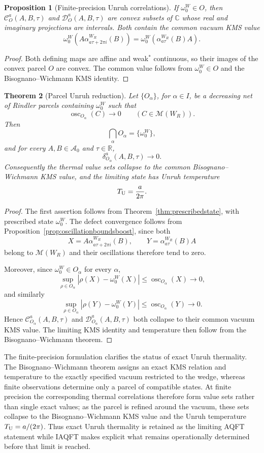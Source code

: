 \documentclass[11pt]{article}
\newtheorem{theorem}{Theorem}[section]
\newtheorem{proposition}[theorem]{Proposition}
\begin{document}
\begin{proposition}[Finite-precision Unruh correlations]
\label{thm:intervalunruh}
If $\omega_0^W\in O$, then
$\mathcal C_O^a(A,B,\tau)$ and
$\mathcal D_O^a(A,B,\tau)$ are convex subsets of $\mathbb C$ whose real
and imaginary projections are intervals. Both contain the common vacuum
KMS value
\[
\omega_0^W(A\alpha^{W_R}_{a\tau+2\pi i}(B))
=
\omega_0^W(\alpha^{W_R}_{a\tau}(B)A).
\]
\end{proposition}

\begin{proof}
Both defining maps are affine and weak$^*$ continuous, so their images of
the convex parcel $O$ are convex. The common value follows from
$\omega_0^W\in O$ and the Bisognano--Wichmann KMS identity.
\end{proof}

\begin{theorem}[Parcel Unruh reduction]
\label{thm:refinementunruh}
Let $\{O_\alpha\}$, for $\alpha\in I$,  be a decreasing net of Rindler parcels containing
$\omega_0^W$ such that
\[
\operatorname{osc}_{O_\alpha}(C)\longrightarrow0
\qquad(C\in\mathcal M(W_R)).
\]
Then
\[
\bigcap_\alpha O_\alpha=\{\omega_0^W\},
\]
and for every $A,B\in\mathcal A_0$ and $\tau\in\mathbb R$,
\[
\delta_{O_\alpha}^a(A,B,\tau)\longrightarrow0.
\]
Consequently the thermal value sets collapse to the common
Bisognano--Wichmann KMS value, and the limiting state has Unruh
temperature
\[
T_{\rm U}=\frac{a}{2\pi}.
\]
\end{theorem}
\begin{proof}
The first assertion follows from
Theorem~\ref{thm:prescribedstate}, with prescribed state $\omega_0^W$.
The defect convergence follows from
Proposition~\ref{prop:oscillationboundsboost}, since both
\[
X=A\alpha^{W_R}_{a\tau+2\pi i}(B),
\qquad
Y=\alpha^{W_R}_{a\tau}(B)A
\]
belong to $\mathcal M(W_R)$ and their oscillations therefore tend to
zero.

Moreover, since $\omega_0^W\in O_\alpha$ for every $\alpha$,
\[
\sup_{\rho\in O_\alpha}
|\rho(X)-\omega_0^W(X)|
\leq
\operatorname{osc}_{O_\alpha}(X)
\longrightarrow0,
\]
and similarly
\[
\sup_{\rho\in O_\alpha}
|\rho(Y)-\omega_0^W(Y)|
\leq
\operatorname{osc}_{O_\alpha}(Y)
\longrightarrow0.
\]
Hence $\mathcal C_{O_\alpha}^a(A,B,\tau)$ and
$\mathcal D_{O_\alpha}^a(A,B,\tau)$ both collapse to their common
vacuum KMS value. The limiting KMS identity and temperature then follow
from the Bisognano--Wichmann theorem.
\end{proof}
The finite-precision formulation clarifies the status of exact Unruh
thermality. The Bisognano--Wichmann theorem assigns an exact KMS relation
and temperature to the exactly specified vacuum restricted to the wedge,
whereas finite observations determine only a parcel of compatible states.
At finite precision the corresponding thermal correlations therefore form
value sets rather than single exact values; as the parcel is refined
around the vacuum, these sets collapse to the Bisognano--Wichmann KMS
value and the Unruh temperature $T_{\rm U}=a/(2\pi)$. Thus exact Unruh
thermality is retained as the limiting AQFT statement while IAQFT makes
explicit what remains operationally determined before that limit is
reached.
\end{document}
